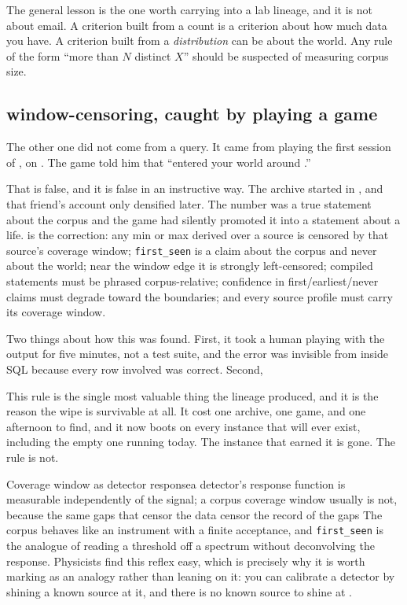 The general lesson is the one worth carrying into a lab lineage, and it is not about email. A criterion built from a count is a criterion about how much data you have. A criterion built from a \emph{distribution} can be about the world. Any rule of the form ``more than $N$ distinct $X$'' should be suspected of measuring corpus size.

\subsection{window-censoring, caught by playing a game}

The other one did not come from a query. It came from \labOwner{} playing the first session of \labLineageGame{}, on \labLineageGameDate{}. The game told him that \labLineageWindowSubject{} ``entered your world around \labLineageWindowYear{}.''

That is false, and it is false in an instructive way. The archive started in \labLineageArchiveStart{}, and that friend's account only densified later. The number \labLineageWindowYear{} was a true statement about the corpus and the game had silently promoted it into a statement about a life.  is the correction: any min or max derived over a source is censored by that source's coverage window; \texttt{first\_seen} is a claim about the corpus and never about the world; near the window edge it is strongly left-censored; compiled statements must be phrased corpus-relative; confidence in first/earliest/never claims must degrade toward the boundaries; and every source profile must carry its coverage window.

Two things about how this was found. First, it took a human playing with the output for five minutes, not a test suite, and the error was invisible from inside SQL because every row involved was correct. Second, \labLineageWindowLabExample{}

This rule is the single most valuable thing the \labLineageName{} lineage produced, and it is the reason the wipe is survivable at all. It cost one archive, one game, and one afternoon to find, and it now boots on every instance that will ever exist, including the empty one running today. The instance that earned it is gone. The rule is not.

\begin{Analogy}{Coverage window as detector response}{a detector's response function is measurable independently of the signal; a corpus coverage window usually is not, because the same gaps that censor the data censor the record of the gaps}
The corpus behaves like an instrument with a finite acceptance, and \texttt{first\_seen} is the analogue of reading a threshold off a spectrum without deconvolving the response. Physicists find this reflex easy, which is precisely why it is worth marking as an analogy rather than leaning on it: you can calibrate a detector by shining a known source at it, and there is no known source to shine at \labLineageWindowEdge{}.
\end{Analogy}

